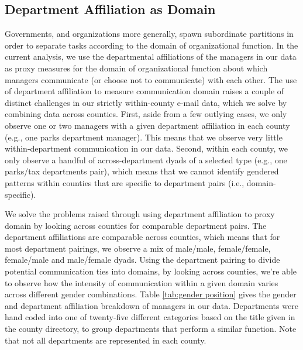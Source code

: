 \documentclass{pnastwo}
\begin{document}
\begin{article}
\section{Department Affiliation as Domain}

Governments, and organizations more generally, spawn subordinate partitions in order to separate tasks according to the domain of organizational function. In the current analysis, we use the departmental affiliations of the managers in our data as proxy measures for the domain of organizational function about which managers communicate (or choose not to communicate) with each other. The use of department affiliation to measure communication domain raises a couple of distinct challenges in our strictly within-county e-mail data, which we solve by combining data across counties. First, aside from a few outlying cases, we only observe one or two managers with a given department affiliation in each county (e.g., one parks department manager). This means that we observe very little within-department communication in our data. Second, within each county, we only observe a handful of across-department dyads of a selected type (e.g., one parks/tax departments pair), which means that we cannot identify gendered patterns within counties that are specific to department pairs (i.e., domain-specific).

We solve the problems raised through using department affiliation to proxy domain by looking across counties for comparable department pairs. The department affiliations are comparable across counties, which means that for most department pairings, we observe a mix of male/male, female/female, female/male and male/female dyads.  Using the department pairing to divide potential communication ties into domains, by looking across counties, we're able to observe how the intensity of communication within a given domain varies across different gender combinations. Table \ref{tab:gender position} gives the gender and department affiliation breakdown of managers in our data. Departments were hand coded into one of twenty-five different categories based on the title given in the county directory, to group departments that perform a similar function. Note that not all departments are represented in each county.

\setlength{\tabcolsep}{4pt}
\begin{table}
  \centering
  \begin{tabular}{rrrrrrrrrrrrrrrrrrrrrrrrrrrrr}
    \toprule
	

\end{tabular}
\end{table}
\end{article}
\end{document}
